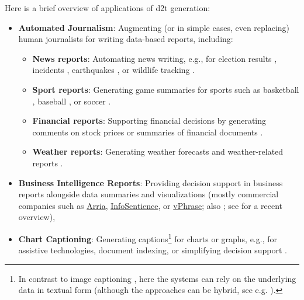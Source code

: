 Here is a brief overview of applications of \ac{d2t} generation:

\begin{itemize}
    \item \textbf{Automated Journalism}: Augmenting (or in simple cases, even replacing) human journalists for writing data-based reports, including:
          \begin{itemize}
              \item \textbf{News reports}: Automating news writing, e.g., for election results \cite{leppanen2017data}, incidents \cite{vanderleeCACAPODatasetMultilingual2020}, earthquakes \cite{oremus2014first}, or wildlife tracking \cite{siddharthan2012blogging,ponnamperuma2013tag2blog}.
              \item \textbf{Sport reports}: Generating game summaries for sports such as basketball \cite{wiseman2017challenges,thomson2020sportsett}, baseball \cite{puduppullyDatatotextGenerationEntity2019}, or soccer \cite{van2017pass}.
              \item \textbf{Financial reports}: Supporting financial decisions by generating comments on stock prices \cite{murakami2017learning,aoki2018generating} or summaries of financial documents \cite{chapman2022towards}.
              \item \textbf{Weather reports}: Generating weather forecasts and weather-related reports \cite{goldberg1994using,belz2005corpus,belz2008automatic,angeli-etal-2010-simple,balakrishnan2019constrained}.
          \end{itemize}
    \item \textbf{Business Intelligence Reports}: Providing decision support in business reports alongside data summaries and visualizations (mostly commercial companies such as \href{https://www.arria.com}{Arria}, \href{https://infosentience.com}{InfoSentience}, or \href{https://www.vphrase.com}{vPhrase}; also \citealp{perlitzDiversityEnhancedTabletoText2022}; see \citealp{daleNavigatingTextGeneration2023} for a recent overview),
    \item \textbf{Chart Captioning}: Generating captions\footnote{In contrast to image captioning \cite{stefanini2022show}, here the systems can rely on the underlying data in textual form (although the approaches can be hybrid, see e.g. \citealp{kantharajCharttoTextLargeScaleBenchmark2022}).} for charts or graphs, e.g., for assistive technologies, document indexing, or simplifying decision support \cite{demirGeneratingTextualSummaries2008,demirSummarizingInformationGraphics2012,obeidCharttoTextGeneratingNatural2020,kantharajCharttoTextLargeScaleBenchmark2022}.

\end{itemize}

